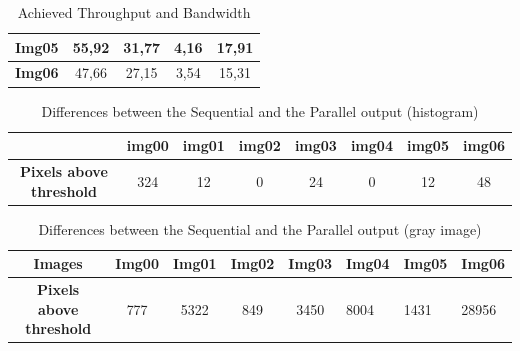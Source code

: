 \documentclass[a4paper]{article}
\begin{document}
\begin{table}[!ht]
\begin{tabular}{|l|c|c|c|c|}
\textbf{Img05}  & 55,92                                                                         & 31,77                                                                    & 4,16                                                                        & 17,91                                                                         \\ \hline
\textbf{Img06}  & 47,66                                                                         & 27,15                                                                    & 3,54                                                                        & 15,31                                                                         \\ \hline
\end{tabular}
\caption{Achieved Throughput and Bandwidth}
\label{tab:histo_mtb}
\end{table}
\FloatBarrier


\begin{table}[!ht]
\centering
\begin{tabular}{|c|l|c|c|l|l|l|l|}
\hline
\textbf{}                        & \textbf{img00}           & \textbf{img01} & \textbf{img02} & \textbf{img03}          & \textbf{img04}         & \textbf{img05}          & \textbf{img06}          \\ \hline
\textbf{Pixels above  threshold} & \multicolumn{1}{c|}{324} & 12             & 0              & \multicolumn{1}{c|}{24} & \multicolumn{1}{c|}{0} & \multicolumn{1}{c|}{12} & \multicolumn{1}{c|}{48} \\ \hline
\end{tabular}
\caption{Differences between the Sequential and the Parallel output (histogram)}
\label{tab:pxabh}
\end{table}
\FloatBarrier

\begin{table}[!ht]
\centering
\begin{tabular}{|c|c|c|c|c|l|l|l|}
\hline
\textbf{Images}                 & \textbf{Img00} & \textbf{Img01} & \textbf{Img02} & \textbf{Img03} & \textbf{Img04} & \textbf{Img05} & \textbf{Img06} \\ \hline
\textbf{Pixels above threshold} & 777            & 5322           & 849            & 3450           & 8004           & 1431           & 28956          \\ \hline
\end{tabular}
\caption{Differences between the Sequential and the Parallel output (gray image)}
\label{tab:pxabhg}
\end{table}
\FloatBarrier
 
\end{document}
